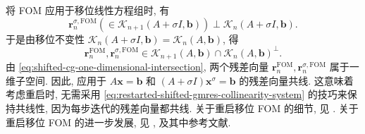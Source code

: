 {将 FOM 应用于移位线性方程组时, 有}
\[\bm r_n^{\sigma,\mathrm{FOM}}(\in\mathcal K_{n+1}(A+\sigma I,\bm b))\perp\mathcal K_n(A+\sigma I,\bm b).\]
{于是由移位不变性 $\mathcal K_n(A+\sigma I,\bm b)=\mathcal K_n(A,\bm b)$, 得}
\[\bm r_n^{\mathrm{FOM}},\bm r_n^{\sigma,\mathrm{FOM}}\in\mathcal K_{n+1}(A,\bm b)\cap\mathcal K_n(A,\bm b)^{\perp}.\]
{由 \eqref{eq:shifted-cg-one-dimensional-intersection}, 两个残差向量 $\bm r_n^{\mathrm{FOM}},\bm r_n^{\sigma,\mathrm{FOM}}$ 属于一维子空间. 因此, 应用于 $A\bm x=\bm b$ 和 $(A+\sigma I)\bm x^{\sigma}=\bm b$ 的残差向量共线. 这意味着考虑重启时, 无需采用 \eqref{eq:restarted-shifted-gmres-collinearity-system} 的技巧来保持共线性, 因为每步迭代的残差向量都共线. 关于重启移位 FOM 的细节, 见 . 关于重启移位 FOM 的进一步发展, 见 ,  及其中参考文献.}
